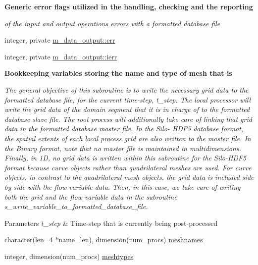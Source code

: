 \begin{Indent}\textbf{ Generic error flags utilized in the handling, checking and the reporting}\par
{\em of the input and output operations errors with a formatted database file }\begin{DoxyCompactItemize}
\item 
integer, private \hyperlink{namespacem__data__output_a9200025029de298307a47699927a60fa}{m\+\_\+data\+\_\+output\+::err}
\item 
integer, private \hyperlink{namespacem__data__output_afa88ae36e1e20ff64867261ef6c9be15}{m\+\_\+data\+\_\+output\+::ierr}
\end{DoxyCompactItemize}
\end{Indent}
\begin{Indent}\textbf{ Bookkeeping variables storing the name and type of mesh that is}\par
{\em The general objective of this subroutine is to write the necessary grid data to the formatted database file, for the current time-\/step, t\+\_\+step. The local processor will write the grid data of the domain segment that it is in charge of to the formatted database slave file. The root process will additionally take care of linking that grid data in the formatted database master file. In the Silo-\/ H\+D\+F5 database format, the spatial extents of each local process grid are also written to the master file. In the Binary format, note that no master file is maintained in multidimensions. Finally, in 1D, no grid data is written within this subroutine for the Silo-\/\+H\+D\+F5 format because curve objects rather than quadrilateral meshes are used. For curve objects, in contrast to the quadrilateral mesh objects, the grid data is included side by side with the flow variable data. Then, in this case, we take care of writing both the grid and the flow variable data in the subroutine s\+\_\+write\+\_\+variable\+\_\+to\+\_\+formatted\+\_\+database\+\_\+file.


\begin{DoxyParams}{Parameters}
{\em t\+\_\+step} & Time-\/step that is currently being post-\/processed \\
\hline
\end{DoxyParams}
}\begin{DoxyCompactItemize}
\item 
character(len=4 $\ast$name\+\_\+len), dimension(num\+\_\+procs) \hyperlink{m__data__output_8f90_a6072065026442573b37ac7e4bbd0bc25}{meshnames}
\item 
integer, dimension(num\+\_\+procs) \hyperlink{m__data__output_8f90_ab445dfab128e2e9f8b7e51f51f54c095}{meshtypes}
\end{DoxyCompactItemize}
\end{Indent}
